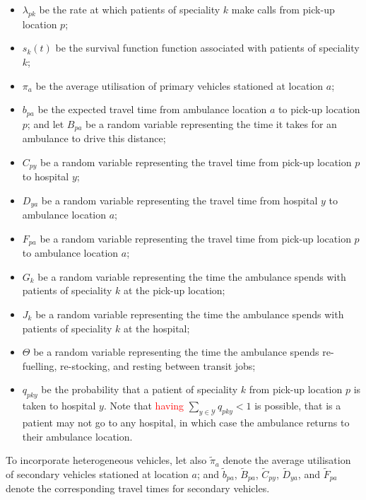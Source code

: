 \documentclass[numbers,webpdf,imaman]{ima-authoring-template}%
\begin{document}
\begin{itemize}
  \item $\lambda_{pk}$ be the rate at which patients of speciality $k$ make
        calls from pick-up location $p$;
  \item $s_k(t)$ be the survival function function associated with patients of
        speciality $k$;
  \item $\pi_a$ be the average utilisation of primary vehicles stationed at
        location $a$;
  \item $b_{pa}$ be the expected travel time from ambulance location $a$ to
        pick-up location $p$; and let $B_{pa}$ be a random variable representing
        the time it takes for an ambulance to drive this distance;
  \item $C_{py}$ be a random variable representing the travel time from pick-up
        location $p$ to hospital $y$;
  \item $D_{ya}$ be a random variable representing the travel time from hospital
        $y$ to ambulance location $a$;
  \item $F_{pa}$ be a random variable representing the travel time from pick-up
        location $p$ to ambulance location $a$;
  \item $G_k$ be a random variable representing the time the ambulance spends
        with patients of speciality $k$ at the pick-up location;
  \item $J_k$ be a random variable representing the time the ambulance spends
        with patients of speciality $k$ at the hospital;
  \item $\Theta$ be a random variable representing the time the ambulance spends
        re-fuelling, re-stocking, and resting between transit jobs;
  \item $q_{pky}$ be the probability that a patient of speciality $k$ from
        pick-up location $p$ is taken to hospital $y$.
        Note that \textcolor{red}{having} $\sum_{y \in \mathcal{Y}} q_{pky} < 1$ is possible, that is a
        patient may not go to any hospital, in which case the ambulance returns
        to their ambulance location.
\end{itemize}

To incorporate heterogeneous vehicles, let also $\tilde{\pi}_a$ denote the
average utilisation of secondary vehicles stationed at location $a$; and
$\tilde{b}_{pa}$, $\tilde{B}_{pa}$, $\tilde{C}_{py}$, $\tilde{D}_{ya}$, and
$\tilde{F}_{pa}$ denote the corresponding travel times for secondary vehicles.
\end{document}
